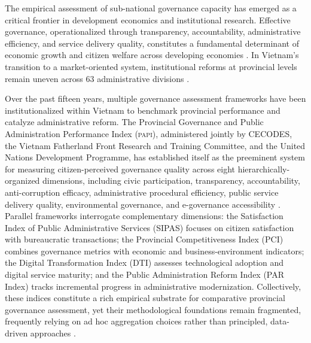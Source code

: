 \documentclass[12pt,a4paper]{article}
\newcommand{\PAPI}{\textsc{papi}\xspace}
\begin{document}
The empirical assessment of sub-national governance capacity has emerged as a critical frontier in development economics and institutional research. Effective governance, operationalized through transparency, accountability, administrative efficiency, and service delivery quality, constitutes a fundamental determinant of economic growth and citizen welfare across developing economies \citep{Acemoglu2012, Kaufmann2011}. In Vietnam's transition to a market-oriented system, institutional reforms at provincial levels remain uneven across 63 administrative divisions \citep{PAPI2024}.

Over the past fifteen years, multiple governance assessment frameworks have been institutionalized within Vietnam to benchmark provincial performance and catalyze administrative reform. The Provincial Governance and Public Administration Performance Index (\PAPI), administered jointly by CECODES, the Vietnam Fatherland Front Research and Training Committee, and the United Nations Development Programme, has established itself as the preeminent system for measuring citizen-perceived governance quality across eight hierarchically-organized dimensions, including civic participation, transparency, accountability, anti-corruption efficacy, administrative procedural efficiency, public service delivery quality, environmental governance, and e-governance accessibility \citep{PAPI2024}. Parallel frameworks interrogate complementary dimensions: the Satisfaction Index of Public Administrative Services (SIPAS) focuses on citizen satisfaction with bureaucratic transactions; the Provincial Competitiveness Index (PCI) combines governance metrics with economic and business-environment indicators; the Digital Transformation Index (DTI) assesses technological adoption and digital service maturity; and the Public Administration Reform Index (PAR Index) tracks incremental progress in administrative modernization. Collectively, these indices constitute a rich empirical substrate for comparative provincial governance assessment, yet their methodological foundations remain fragmented, frequently relying on ad hoc aggregation choices rather than principled, data-driven approaches \citep{Greco2016}.
\end{document}
